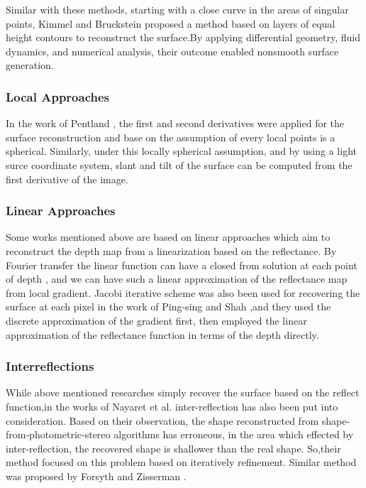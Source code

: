 Similar with these methods, starting with a close curve in the areas of singular points, Kimmel and Bruckstein \cite{kimmel1992shape} proposed a method  based on layers of equal height contours to reconstruct the surface.By applying differential geometry, fluid dynamics, and numerical analysis, their outcome enabled nonsmooth surface generation. 


\subsubsection{Local Approaches}
In the work of Pentland \cite{pentland1984local}, the first and second derivatives were applied for the surface reconstruction and base on the assumption of every local points is a spherical. Similarly, under this locally spherical assumption,  and by using a light surce coordinate system, slant and tilt of the surface can be computed \cite{lee1985improved} from the first derivative of the image. 

\subsubsection{Linear Approaches}
Some works mentioned above are based on linear approaches which aim to reconstruct the depth map from a linearization based on the reflectance. By Fourier transfer the linear function can have a closed from solution at each point of depth \cite{pentland1989shape} , and we can have such a linear approximation of the reflectance map from local gradient. 
Jacobi iterative scheme was also been used for recovering the surface at each pixel in the work of Ping-sing and Shah \cite{ping1994shape},and they used the discrete approximation of the gradient first, then employed the linear approximation of the reflectance function in terms of the depth directly.

\subsubsection{Interreflections}
While above mentioned researches simply recover the surface based on the reflect function,in the works of Nayaret et al. \cite{nayar1989surface} \cite{nayar1990shape} inter-reflection has also been put into consideration. Based on their observation, the shape reconstructed from shape-from-photometric-stereo algorithms has erroneous, in the area which effected by inter-reflection, the recovered shape is shallower than the real shape.  So,their method focused on this problem based on iteratively refinement. Similar method was proposed by Forsyth and Zisserman \cite{forsyth1989mutual}.

